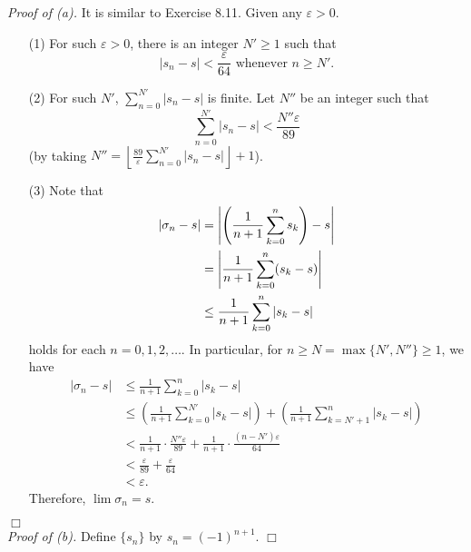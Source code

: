\documentclass{article}
\begin{document}
\emph{Proof of (a).}
It is similar to Exercise 8.11.
Given any $\varepsilon > 0$.
\begin{enumerate}
\item[(1)]
For such $\varepsilon > 0$, there is an integer $N' \geq 1$ such that
$$|s_n-s| < \frac{\varepsilon}{64} \text{ whenever } n \geq N'.$$
\item[(2)]
For such $N'$, $\sum_{n=0}^{N'} |s_n-s|$ is finite.
Let $N''$ be an integer such that $$\sum_{n=0}^{N'} |s_n-s| < \frac{N''\varepsilon}{89}$$
(by taking $N'' = \left\lfloor \frac{89}{\varepsilon}\sum_{n=0}^{N'} |s_n-s| \right\rfloor + 1$).
\item[(3)]
Note that
  \begin{align*}
  |\sigma_n - s|
  &= \abs{ \left(\frac{1}{n+1}\sum_{k=0}^n s_k\right) - s } \\
  &= \abs{ \frac{1}{n+1}\sum_{k=0}^n (s_k - s) } \\
  &\leq \frac{1}{n+1}\sum_{k=0}^n |s_k - s|
  \end{align*}
holds for each $n=0,1,2,\ldots$.
In particular, for $n \geq N = \max\{N', N''\} \geq 1$, we have
  \begin{align*}
  |\sigma_{n} - s|
  &\leq \frac{1}{n+1}\sum_{k=0}^{n} |s_k - s| \\
  &\leq \left( \frac{1}{n+1}\sum_{k=0}^{N'}|s_k - s| \right)
    + \left( \frac{1}{n+1}\sum_{k=N'+1}^{n}|s_k - s| \right) \\
  &< \frac{1}{n+1} \cdot \frac{N''\varepsilon}{89}
    + \frac{1}{n+1} \cdot \frac{(n-N')\varepsilon}{64} \\
  &< \frac{\varepsilon}{89} + \frac{\varepsilon}{64} \\
  &< \varepsilon.
  \end{align*}
Therefore, $\lim \sigma_n = s$.
\end{enumerate}
$\Box$ \\



\emph{Proof of (b).}
Define $\{s_n\}$ by $s_n = (-1)^{n+1}$.
$\Box$ \\
\end{document}
